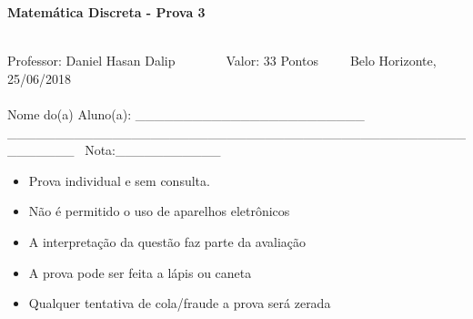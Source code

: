 \documentclass[16pt]{examdesign}
\begin{document}
\begin{examtop}

      
    \begin{multicols}{2}[]
    \begin{minipage}{2.5cm}
    \end{minipage}
      \columnbreak
      \begin{minipage}{400px}
      \begin{center}\large{\textbf{Matemática Discreta - Prova 3}}\end{center}~\\
      Professor: Daniel Hasan Dalip~~~~~~~~Valor: 33 Pontos~~~~~Belo Horizonte, 25/06/2018\\~\\
      Nome do(a) Aluno(a): \_\_\_\_\_\_\_\_\_\_\_\_\_\_\_\_\_\_\_\_\_\_\_\_	\_\_\_\_\_\_\_\_\_\_\_\_\_\_\_\_\_\_\_\_\_\_\_\_\_\_\_\_\_\_\_\_\_\_\_\_\_\_\_\_\_\_\_\_\_\_\_\_\_\_\_\_\_\_\_~
      Nota:\_\_\_\_\_\_\_\_\_\_\_\\       
      \end{minipage}



    \end{multicols}
  \hrulefill
  \begin{multicols}{2}[]
  
    \begin{itemize}
    \item Prova individual e sem consulta.\vspace{-6pt}
    \item Não é permitido o uso de aparelhos eletrônicos  \vspace{-6pt}
    \item A interpretação da questão faz parte da avaliação  \vspace{-6pt}
    \item A prova pode ser feita a lápis ou caneta  \vspace{-6pt}
    \item Qualquer tentativa de cola/fraude a prova será zerada  \vspace{-6pt}
    \end{itemize}
  \end{multicols}

\def\arraystretch{1}
\end{examtop}
\end{document}
